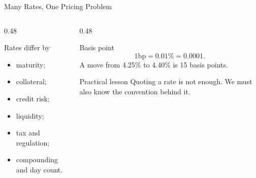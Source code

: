 \documentclass[aspectratio=169,11pt]{beamer}
\newcommand{\bp}{\mathrm{bp}}
\begin{document}
\begin{frame}{Many Rates, One Pricing Problem}
    \begin{columns}[T]
        \begin{column}{0.48\textwidth}
            \begin{block}{Rates differ by}
                \begin{itemize}
                    \item maturity;
                    \item collateral;
                    \item credit risk;
                    \item liquidity;
                    \item tax and regulation;
                    \item compounding and day count.
                \end{itemize}
            \end{block}
        \end{column}
        \begin{column}{0.48\textwidth}
            \begin{block}{Basis point}
                \[
                    1\bp=0.01\%=0.0001.
                \]
                A move from 4.25\% to 4.40\% is 15 basis points.
            \end{block}

            \begin{alertblock}{Practical lesson}
                Quoting a rate is not enough. We must also know the convention behind it.
            \end{alertblock}
        \end{column}
    \end{columns}
\end{frame}
\end{document}
